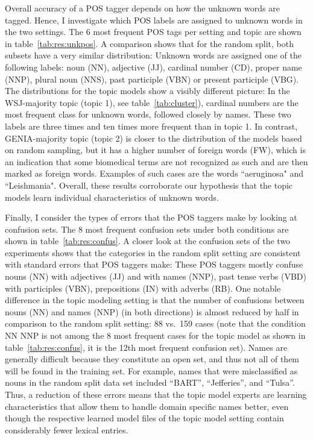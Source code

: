 Overall accuracy of a POS tagger depends on how the unknown words are tagged. Hence, I investigate which POS labels are assigned to unknown words in the two settings. The 6 most frequent POS tags per setting and topic are shown in table~\ref{tab:res:unkpos}. A comparison shows that for the random split, both subsets have a very similar distribution: Unknown words are assigned one of the following labels: noun (NN), adjective (JJ), cardinal number (CD), proper name (NNP),  plural noun (NNS), past participle (VBN) or present  participle (VBG). The distributions for the topic models show a visibly different picture: In the %
WSJ-majority topic (topic 1), see table~\ref{tab:cluster}), cardinal numbers are the most frequent class for unknown words, followed closely by names. These two labels are three times and ten times more frequent than in topic 1.  In contrast, GENIA-majority topic (topic 2) is closer to the distribution of the models based on random sampling, but it has a higher number of foreign words (FW), which is an indication that some biomedical terms are not recognized as such and are then marked as foreign words. Examples of such cases  are the words ``aeruginosa" and ``Leishmania". Overall, these results  corroborate our hypothesis that the topic models learn individual characteristics of unknown words.


Finally, I consider the types of errors that the POS taggers make by looking at confusion sets. %
The 8 most frequent confusion sets under both conditions are shown in table~\ref{tab:res:confus}. A closer look at the confusion sets of the two experiments shows that the categories in the random split setting are consistent with standard errors that POS taggers make: These POS taggers mostly confuse nouns (NN) with adjectives (JJ) and with names (NNP), past tense verbs (VBD) with participles (VBN), prepositions (IN) with adverbs (RB). One notable difference in the topic modeling setting is that the number of confusions between nouns (NN) and names (NNP) (in both directions) is almost reduced by half in comparison to the random split setting: 88 vs.\ 159 cases (note that the condition NN NNP is not among the 8 most frequent cases for the topic model as shown in table~\ref{tab:res:confus}, it is the 12th most frequent confusion set). Names are generally difficult because they constitute an open set, and thus not all of them will be found in the training set. For example, names that were misclassified as nouns in the random split data set included ``BART'', ``Jefferies'', and ``Tulsa''. Thus, a reduction of these errors means that the topic model experts are learning characteristics that allow them to handle domain specific names better, even though the respective learned model files of the topic model setting contain considerably fewer lexical entries.

